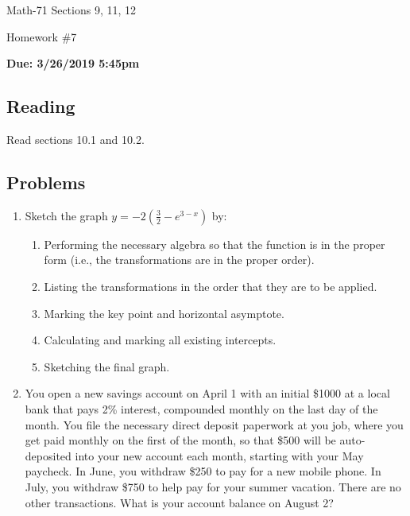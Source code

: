 \documentclass[letterpaper,12pt,fleqn]{article}
\begin{document}
\begin{center}
  \large
  Math-71 Sections 9, 11, 12

  \Large
  Homework \#7

  \large
  \textbf{Due: 3/26/2019 5:45pm}
\end{center}

\subsection*{Reading}

Read sections 10.1 and 10.2.

\subsection*{Problems}

\begin{enumerate}
\item Sketch the graph \(y=-2\left(\frac{3}{2}-e^{3-x}\right)\) by:
  \begin{enumerate}
  \item Performing the necessary algebra so that the function is in the proper form (i.e., the transformations are in the
    proper order).
  \item Listing the transformations in the order that they are to be applied.
  \item Marking the key point and horizontal asymptote.
  \item Calculating and marking all existing intercepts.
  \item Sketching the final graph.
  \end{enumerate}

\item You open a new savings account on April 1 with an initial \$1000 at a local bank that pays 2\% interest, compounded
  monthly on the last day of the month.  You file the necessary direct deposit paperwork at you job, where you get paid
  monthly on the first of the month, so that \$500 will be auto-deposited into your new account each month, starting with
  your May paycheck.  In June, you withdraw \$250 to pay for a new mobile phone.  In July, you withdraw \$750 to help pay
  for your summer vacation.  There are no other transactions.  What is your account balance on August 2?
\end{enumerate}
\end{document}
